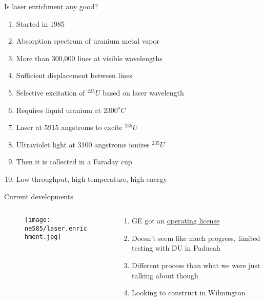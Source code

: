 \documentclass[aspectratio=1610,pdftex,dvipsnames,compress,xcolor={dvipsnames}]{beamer}
\begin{document}
\begin{frame}{Is laser enrichment any good?}
    \begin{enumerate}[topsep=0pt,itemsep=11pt,leftmargin=*,label=(\arabic*)]
        \item[]Started in 1985
        \item[]Absorption spectrum of uranium metal vapor
        \item[]More than 300,000 lines at visible wavelengths
        \item[]Sufficient displacement between lines
        \item[]Selective excitation of $^{235}U$ based on laser wavelength
        \item[]Requires liquid uranium at $2300^oC$
        \item[]Laser at 5915 angstroms to excite $^{235}U$
        \item[]Ultraviolet light at 3100 angstroms ionizes $^{235}U$
        \item[]Then it is collected in a Faraday cup
        \item[]Low throughput, high temperature, high energy
    \end{enumerate}
\end{frame}


\begin{frame}{Current developments}
    \begin{columns}[t]

        \begin{column}{0.45\textwidth}
            \begin{figure}
                \centering
                \texttt{[image: ne585/laser.enrichment.jpg]}
            \end{figure}
        \end{column}

        \begin{column}{0.55\textwidth}
            \begin{enumerate}[series=outerlist,topsep=0pt,itemsep=15pt,leftmargin=*,label=(\arabic*)]
                \item[]GE got an \href{https://www.world-nuclear-news.org/Articles/US-government-approves-GLE-restructure}{operating license}
                \item[]Doesn't seem like much progress, limited testing with DU in Paducah
                \item[]Different process than what we were just talking about though 
                \item[]Looking to construct in Wilmington
            \end{enumerate}
        \end{column}

    \end{columns}
\end{frame}
\end{document}
